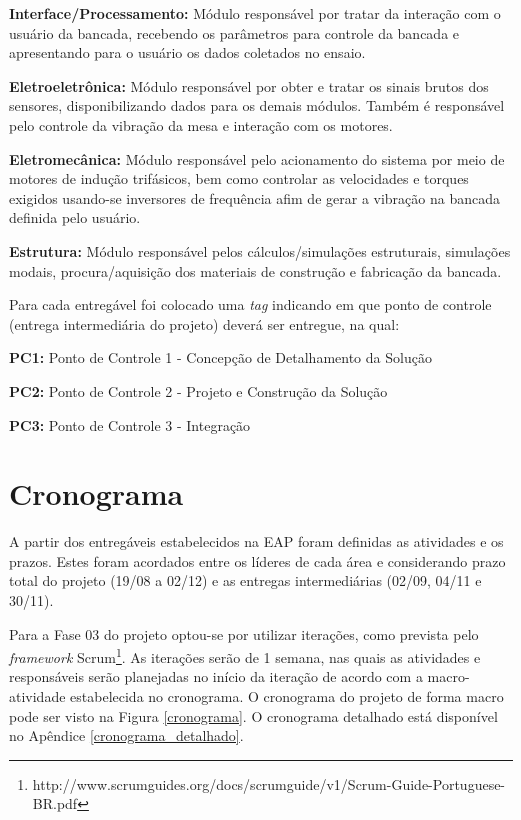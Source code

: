 \textbf{Interface/Processamento:} Módulo responsável por tratar da interação com o usuário da bancada, recebendo os parâmetros para controle da bancada e apresentando para o usuário os dados coletados no ensaio.

\textbf{Eletroeletrônica:} Módulo responsável por obter e tratar os sinais brutos dos sensores, disponibilizando dados para os demais módulos. Também é responsável pelo controle da vibração da mesa e interação com os motores.

\textbf{Eletromecânica:} Módulo responsável pelo acionamento do sistema por meio de motores de indução trifásicos, bem como controlar as velocidades e torques exigidos usando-se inversores de frequência afim de gerar a vibração na bancada definida pelo usuário.

\textbf{Estrutura:} Módulo responsável pelos cálculos/simulações estruturais, simulações modais, procura/aquisição dos materiais de construção e fabricação da bancada.

Para cada entregável foi colocado uma \textit{tag} indicando em que ponto de controle (entrega intermediária do projeto) deverá ser entregue, na qual:

\indent \textbf{PC1:} Ponto de Controle 1 - Concepção de Detalhamento da Solução

\indent \textbf{PC2:} Ponto de Controle 2 - Projeto e Construção da Solução

\indent \textbf{PC3:} Ponto de Controle 3 - Integração

\section*{Cronograma}

A partir dos entregáveis estabelecidos na EAP foram definidas as atividades e os prazos. Estes foram acordados entre os líderes de cada área e considerando prazo total do projeto (19/08 a 02/12) e as entregas intermediárias (02/09, 04/11 e 30/11).

Para a Fase 03 do projeto optou-se por utilizar iterações, como prevista pelo \textit{framework} Scrum\footnote{http://www.scrumguides.org/docs/scrumguide/v1/Scrum-Guide-Portuguese-BR.pdf}. As iterações serão de 1 semana, nas quais as atividades e responsáveis serão planejadas no início da iteração de acordo com a macro-atividade estabelecida no cronograma.
O cronograma do projeto de forma macro pode ser visto na Figura \ref{cronograma}. O cronograma detalhado está disponível no Apêndice \ref{cronograma_detalhado}.

